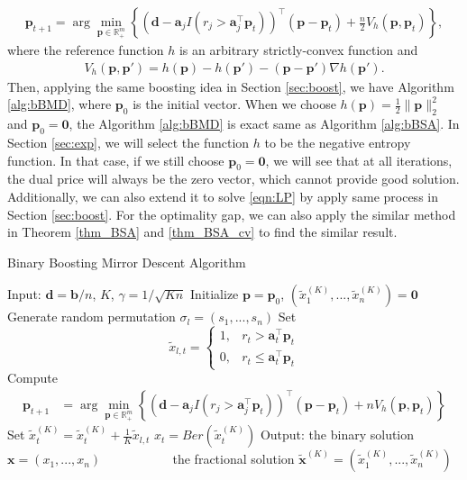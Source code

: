 \documentclass{article} %
\begin{document}
\begin{align}
\label{upt:md}
    \bm{p}_{t+1} 
    =
    \arg\min\limits_{\bm{p}\in\mathbb{R}^{m}_{+}} \left\{
        \left(\bm{d}-\bm{a}_jI(r_j>\bm{a}_j^{\top}\bm{p}_t)\right)^{\top}\left(\bm{p}-\bm{p}_t\right)
        +
        \frac{n}{2}V_h(\bm{p},\bm{p}_t)
    \right\},
\end{align}
where the reference function $h$ is an arbitrary strictly-convex function and
\begin{align*}
    V_h(\bm{p},\bm{p}')
    =
    h(\bm{p})-h(\bm{p}')-(\bm{p}-\bm{p}')\nabla h(\bm{p'}).
\end{align*}
Then, applying the same boosting idea in Section \ref{sec:boost}, we have Algorithm \ref{alg:bBMD}, where $\bm{p}_0$ is the initial vector. When we choose $h(\bm{p})=\frac{1}{2}\|\bm{p}\|_2^2$ and $\bm{p}_0=\bm{0}$, the Algorithm \ref{alg:bBMD} is exact same as Algorithm \ref{alg:bBSA}. In Section \ref{sec:exp}, we will select the function $h$ to be the negative entropy function. In that case, if we still choose $\bm{p}_0=\bm{0}$, we will see that at all iterations, the dual price will always be the zero vector, which cannot provide good solution. Additionally, we can also extend it to solve \eqref{eqn:LP} by apply same process in Section \ref{sec:boost}. For the optimality gap, we can also apply the similar method in Theorem \ref{thm_BSA} and \ref{thm_BSA_cv} to find the similar result.

\begin{algorithm}[ht!]
\caption{Binary Boosting Mirror Descent Algorithm}
\label{alg:bBMD}
\begin{algorithmic}[1]
\State Input: $\bm{d}=\bm{b}/n$, $K$, $\gamma=1/\sqrt{Kn}$
\State Initialize $\bm{p} = \bm{p}_0$, $(\tilde{{x}}^{(K)}_1,...,\tilde{{x}}^{(K)}_n)=\bm{0}$
    \State Generate random permutation $\sigma_l=(s_1,...,s_n)$
        \State Set 
            $$\tilde{x}_{l,t} = \begin{cases}
            1,& r_{t} >\bm{a}_{t}^\top \bm{p}_t \\
            0,& r_{t} \le \bm{a}_{t}^\top \bm{p}_t
            \end{cases}$$
            \State Compute
            \begin{align*}
                \bm{p}_{t+1} & = \arg\min\limits_{\bm{p}\in\mathbb{R}^{m}_{+}} \left\{
                        \left(\bm{d}-\bm{a}_jI(r_j>\bm{a}_j^{\top}\bm{p}_t)\right)^{\top}\left(\bm{p}-\bm{p}_t\right)
                        +
                        nV_h(\bm{p},\bm{p}_t)
                    \right\}
            \end{align*}
            \State Set $\tilde{{x}}^{(K)}_t=\tilde{{x}}^{(K)}_t+\frac{1}{K}\tilde{{x}}_{l,t}$
    \EndFor
\EndFor
{}
    \State $x_t = Ber(\tilde{x}_t^{(K)})$
\EndFor
\State Output: the binary solution $\bm{x} = (x_1,...,x_n)$ 
\State ~~ ~~ ~~ ~~ the fractional solution $\tilde{\bm{x}}^{(K)}= (\tilde{x}_1^{(K)},...,\tilde{x}_n^{(K)})$
\end{algorithmic}
\end{algorithm}
\end{document}
